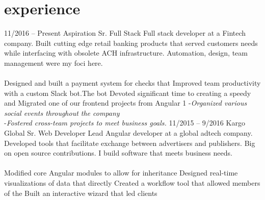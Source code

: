 \documentclass[]{friggeri-cv}
\begin{document}
\section{experience}
\tabentry
  {11/2016 – Present}
  {Aspiration}
  {Sr. Full Stack}
  {Full stack developer at a Fintech company. Built cutting edge retail banking products that served customers needs while interfacing with obsolete ACH infrastructure. Automation, design, team management were my foci here. \\%
  \\%
    \bulletlist
    {Designed and built a payment system for checks that
      }
    {Improved team productivity with a custom Slack bot.The bot
      }
    {Devoted significant time to creating a speedy and 
      }
    {Migrated one of our frontend projects from Angular 1 
      }
    \hspace*{1.5ex}-\hspace{1ex}\emph{Organized various social events throughout the company 
      }\\%
    \hspace*{1.5ex}-\hspace{1ex}\emph{Fostered cross-team projects to meet business goals. 
      }
  }
\pagebreak
\tabentry
  {11/2015 – 9/2016}
  {Kargo Global}
  {Sr. Web Developer}
  {Lead Angular developer at a global adtech company. Developed tools that facilitate exchange between advertisers and publishers. Big on open source contributions. I build software that meets business needs.\\%
  \\%
    \bulletlist
    {Modified core Angular modules to allow for inheritance}
    {Designed real-time visualizations of data that directly}
    {Created a workflow tool that allowed members of the}
    {Built an interactive wizard that led clients }
  }
\end{document}
